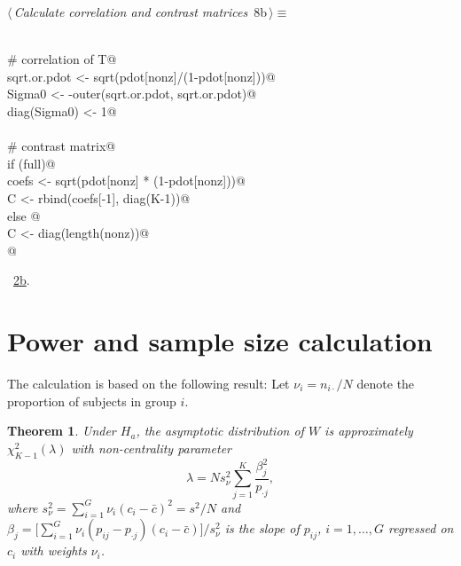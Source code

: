 \documentclass[reqno]{amsart}
\renewcommand{\NWtarget}[2]{\hypertarget{#1}{#2}}
\renewcommand{\NWlink}[2]{\hyperlink{#1}{#2}}
\newtheorem{theorem}{Theorem}
\begin{document}
\begin{flushleft} \small\label{scrap13}\raggedright\small
\NWtarget{nuweb8b}{} $\langle\,${\itshape Calculate correlation and contrast matrices}\nobreak\ {\footnotesize {8b}}$\,\rangle\equiv$
\vspace{-1ex}
\begin{list}{}{} \item
\mbox{}\verb@@\\
\mbox{}\verb@  # correlation of T@\\
\mbox{}\verb@  sqrt.or.pdot <- sqrt(pdot[nonz]/(1-pdot[nonz]))@\\
\mbox{}\verb@  Sigma0 <- -outer(sqrt.or.pdot, sqrt.or.pdot)@\\
\mbox{}\verb@  diag(Sigma0) <- 1@\\
\mbox{}\verb@@\\
\mbox{}\verb@  # contrast matrix@\\
\mbox{}\verb@  if (full){@\\
\mbox{}\verb@    coefs <- sqrt(pdot[nonz] * (1-pdot[nonz]))@\\
\mbox{}\verb@    C <- rbind(coefs[-1], diag(K-1))@\\
\mbox{}\verb@  } else {@\\
\mbox{}\verb@    C <- diag(length(nonz))@\\
\mbox{}\verb@  }@\\
\mbox{}\verb@@{\NWsep}
\end{list}
\vspace{-1.5ex}
\footnotesize
\begin{list}{}{\setlength{\itemsep}{-\parsep}\setlength{\itemindent}{-\leftmargin}}
\item \NWtxtMacroRefIn\ \NWlink{nuweb2b}{2b}.

\item{}
\end{list}
\vspace{4ex}
\end{flushleft}
\section{Power and sample size calculation}
The calculation is based on the following result:
Let $\nu_i=n_{i\cdot}/N$ denote the proportion
of subjects in group $i$. 

\begin{theorem}\label{Th:power}
Under $H_a$, the asymptotic distribution of $W$ is approximately $\chi_{K-1}^2(\lambda)$ with non-centrality parameter
\begin{equation}\label{E:ncp}
  \lambda = N  s_\nu^2 \sum_{j=1}^K \frac{\beta_j^2}{p_{\cdot j}},
\end{equation}
where $s_\nu^2= \sum_{i=1}^G \nu_i(c_i-\bar{c})^2=s^2/N$ and $\beta_j=\big[\sum_{i=1}^G \nu_{i}(p_{ij}-p_{\cdot
  j})(c_i-\bar{c})\big] /s_\nu^2$ is the slope of $p_{ij}$, $i=1,\ldots,G$ regressed on $c_i$ with weights $\nu_i$.
\end{theorem}
\end{document}

